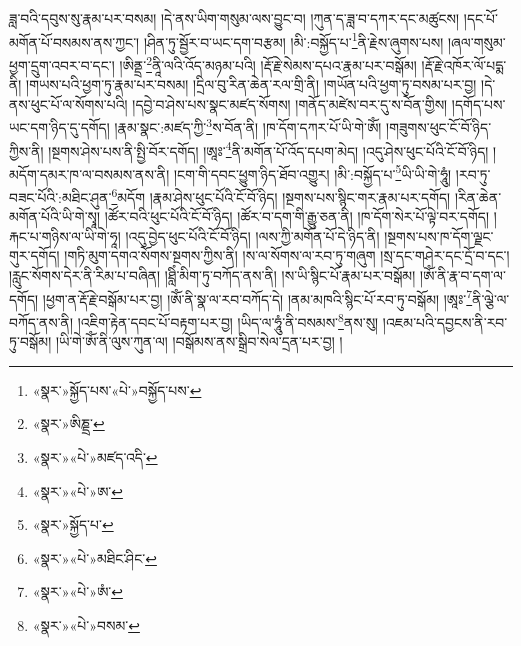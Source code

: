ཟླ་བའི་དབུས་སུ་རྣམ་པར་བསམ། །དེ་ནས་ཡིག་གསུམ་ལས་བྱུང་བ། །ཀུན་ད་ཟླ་བ་དཀར་དང་མཚུངས། །དང་པོ་མགོན་པོ་བསམས་ནས་ཀྱང་། །ཤིན་ཏུ་སྦྱོར་བ་ཡང་དག་བརྩམ། །མི་:བསྐྱོད་པ་\footnote{«སྣར་»སྐྱོད་པས་«པེ་»བསྐྱོད་པས་}ནི་རྗེས་ཞུགས་པས། །ཞལ་གསུམ་ཕྱག་དྲུག་འབར་བ་དང་། །ཨིནྡྲ་\footnote{«སྣར་»ཨིཎྡྲ་}ནཱི་ལའི་འོད་མཉམ་པའི། །རྡོ་རྗེ་སེམས་དཔའ་རྣམ་པར་བསྒོམ། །རྡོ་རྗེ་འཁོར་ལོ་པདྨ་ནི། །གཡས་པའི་ཕྱག་ཏུ་རྣམ་པར་བསམ། །དྲིལ་བུ་རིན་ཆེན་རལ་གྲི་ནི། །གཡོན་པའི་ཕྱག་ཏུ་བསམ་པར་བྱ། །དེ་ནས་ཕུང་པོ་ལ་སོགས་པའི། །དབྱེ་བ་ཤེས་པས་སྣང་མཛད་སོགས། །གནོད་མཛེས་བར་དུ་ས་བོན་གྱིས། །དགོད་པས་ཡང་དག་ཉིད་དུ་དགོད། །རྣམ་སྣང་:མཛད་ཀྱི་\footnote{«སྣར་»«པེ་»མཛད་འདི་}ས་བོན་ནི། །ཁ་དོག་དཀར་པོ་ཡི་གེ་ཨོཾ། །གཟུགས་ཕུང་ངོ་བོ་ཉིད་ཀྱིས་ནི། །སྔགས་ཤེས་པས་ནི་སྤྱི་བོར་དགོད། །ཨཱཿ་\footnote{«སྣར་»«པེ་»ཨ་}ནི་མགོན་པོ་འོད་དཔག་མེད། །འདུ་ཤེས་ཕུང་པོའི་ངོ་བོ་ཉིད། །མདོག་དམར་ཁ་ལ་བསམས་ནས་ནི། །ངག་གི་དབང་ཕྱུག་ཉིད་ཐོབ་འགྱུར། །མི་:བསྐྱོད་པ་\footnote{«སྣར་»སྐྱོད་པ་}ཡི་ཡི་གེ་ཧཱུཾ། །རབ་ཏུ་བཟང་པོའི་:མཐིང་ཤུན་\footnote{«སྣར་»«པེ་»མཐིང་ཤིང་}མདོག །རྣམ་ཤེས་ཕུང་པོའི་ངོ་བོ་ཉིད། །སྔགས་པས་སྙིང་གར་རྣམ་པར་དགོད། །རིན་ཆེན་མགོན་པོའི་ཡི་གེ་སྭཱ། །ཚོར་བའི་ཕུང་པོའི་ངོ་བོ་ཉིད། །ཚོར་བ་དག་གི་རྒྱུ་ཅན་ནི། །ཁ་དོག་སེར་པོ་ལྟེ་བར་དགོད། །རྐང་པ་གཉིས་ལ་ཡི་གེ་ཧཱ། །འདུ་བྱེད་ཕུང་པོའི་ངོ་བོ་ཉིད། །ལས་ཀྱི་མགོན་པོ་དེ་ཉིད་ནི། །སྔགས་པས་ཁ་དོག་ལྗང་གུར་དགོད། །གཏི་མུག་དགའ་སོགས་སྔགས་ཀྱིས་ནི། །ས་ལ་སོགས་ལ་རབ་ཏུ་གཞུག །སྲ་དང་གཤེར་དང་དྲོ་བ་དང་། །རླུང་སོགས་དེར་ནི་རིམ་པ་བཞིན། །ཐླིཾ་མིག་ཏུ་བཀོད་ནས་ནི། །ས་ཡི་སྙིང་པོ་རྣམ་པར་བསྒོམ། །ཨོཾ་ནི་རྣ་བ་དག་ལ་དགོད། །ཕྱག་ན་རྡོ་རྗེ་བསྒོམ་པར་བྱ། །ཨོཾ་ནི་སྣ་ལ་རབ་བཀོད་དེ། །ནམ་མཁའི་སྙིང་པོ་རབ་ཏུ་བསྒོམ། །ཨཱཿ་\footnote{«སྣར་»«པེ་»ཨཾ་}ནི་ལྕེ་ལ་བཀོད་ནས་ནི། །འཇིག་རྟེན་དབང་པོ་བརྟག་པར་བྱ། །ཡིད་ལ་ཧཱུཾ་ནི་བསམས་\footnote{«སྣར་»«པེ་»བསམ་}ནས་སུ། །འཇམ་པའི་དབྱངས་ནི་རབ་ཏུ་བསྒོམ། །ཡི་གེ་ཨོཾ་ནི་ལུས་ཀུན་ལ། །བསྒོམས་ནས་སྒྲིབ་སེལ་དྲན་པར་བྱ། །
